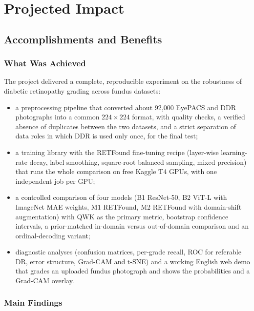 \chapter{Projected Impact}
\label{chap:projected_impact}

\section{Accomplishments and Benefits}
\label{sec:accomplishments}

\subsection{What Was Achieved}
\label{subsec:achieved}

The project delivered a complete, reproducible experiment on the robustness of diabetic retinopathy grading across fundus datasets:
\begin{itemize}[leftmargin=1.5em]
    \item a preprocessing pipeline that converted about 92{,}000 EyePACS and DDR photographs into a common $224\times224$ format, with quality checks, a verified absence of duplicates between the two datasets, and a strict separation of data roles in which DDR is used only once, for the final test;
    \item a training library with the RETFound fine-tuning recipe (layer-wise learning-rate decay, label smoothing, square-root balanced sampling, mixed precision) that runs the whole comparison on free Kaggle T4 GPUs, with one independent job per GPU;
    \item a controlled comparison of four models (B1 ResNet-50, B2 ViT-L with ImageNet MAE weights, M1 RETFound, M2 RETFound with domain-shift augmentation) with QWK as the primary metric, bootstrap confidence intervals, a prior-matched in-domain versus out-of-domain comparison and an ordinal-decoding variant;
    \item diagnostic analyses (confusion matrices, per-grade recall, ROC for referable DR, error structure, Grad-CAM and t-SNE) and a working English web demo that grades an uploaded fundus photograph and shows the probabilities and a Grad-CAM overlay.
\end{itemize}

\subsection{Main Findings}
\label{subsec:main_findings}

